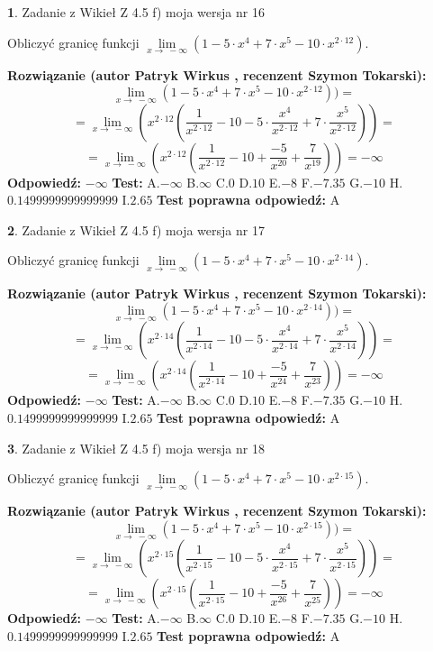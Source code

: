 \documentclass[12pt, a4paper]{article}
\theoremstyle{definition} %
\newtheorem{zad}{}
\newcommand{\zadStart}[1]{\begin{zad}#1\newline}
\newcommand{\zadStop}{\end{zad}}
\newcommand{\rozwStart}[2]{\noindent \textbf{Rozwiązanie (autor #1 , recenzent #2): }\newline}
\newcommand{\rozwStop}{\newline}
\newcommand{\odpStart}{\noindent \textbf{Odpowiedź:}\newline}
\newcommand{\odpStop}{\newline}
\newcommand{\testStart}{\noindent \textbf{Test:}\newline}
\newcommand{\testStop}{\newline}
\newcommand{\kluczStart}{\noindent \textbf{Test poprawna odpowiedź:}\newline}
\newcommand{\kluczStop}{\newline}
\begin{document}
\zadStart{Zadanie z Wikieł Z 4.5 f) moja wersja nr 16}


Obliczyć granicę funkcji  $\lim\limits_{x\to\ -\infty}(1 - 5 \cdot x^{4}+7 \cdot x^{5}- 10 \cdot x^{2\cdot12})$.
\zadStop
\rozwStart{Patryk Wirkus}{Szymon Tokarski}
$$\lim\limits_{x\to\ -\infty}(1 - 5 \cdot x^{4}+7 \cdot x^{5}- 10 \cdot x^{2\cdot12}))=$$
$$=\lim\limits_{x\to\ -\infty}(x^{2\cdot12}(\frac{1}{x^{2\cdot12}}-10 -5 \cdot \frac{x^{4}}{x^{2\cdot12}}+7 \cdot \frac{x^{5}}{x^{2\cdot12}}))=$$
$$=\lim\limits_{x\to\ -\infty}(x^{2\cdot12}(\frac{1}{x^{2\cdot12}}-10 + \frac{-5}{x^{20}}+ \frac{7}{x^{19}}))=-\infty$$
\rozwStop
\odpStart
$-\infty$
\odpStop
\testStart
A.$-\infty$ B.$\infty$ C.$0$ D.$10$ E.$-8$
F.$-7.35$ G.$-10$
H.$0.1499999999999999$
I.$2.65$
\testStop
\kluczStart
A
\kluczStop



\zadStart{Zadanie z Wikieł Z 4.5 f) moja wersja nr 17}


Obliczyć granicę funkcji  $\lim\limits_{x\to\ -\infty}(1 - 5 \cdot x^{4}+7 \cdot x^{5}- 10 \cdot x^{2\cdot14})$.
\zadStop
\rozwStart{Patryk Wirkus}{Szymon Tokarski}
$$\lim\limits_{x\to\ -\infty}(1 - 5 \cdot x^{4}+7 \cdot x^{5}- 10 \cdot x^{2\cdot14}))=$$
$$=\lim\limits_{x\to\ -\infty}(x^{2\cdot14}(\frac{1}{x^{2\cdot14}}-10 -5 \cdot \frac{x^{4}}{x^{2\cdot14}}+7 \cdot \frac{x^{5}}{x^{2\cdot14}}))=$$
$$=\lim\limits_{x\to\ -\infty}(x^{2\cdot14}(\frac{1}{x^{2\cdot14}}-10 + \frac{-5}{x^{24}}+ \frac{7}{x^{23}}))=-\infty$$
\rozwStop
\odpStart
$-\infty$
\odpStop
\testStart
A.$-\infty$ B.$\infty$ C.$0$ D.$10$ E.$-8$
F.$-7.35$ G.$-10$
H.$0.1499999999999999$
I.$2.65$
\testStop
\kluczStart
A
\kluczStop



\zadStart{Zadanie z Wikieł Z 4.5 f) moja wersja nr 18}


Obliczyć granicę funkcji  $\lim\limits_{x\to\ -\infty}(1 - 5 \cdot x^{4}+7 \cdot x^{5}- 10 \cdot x^{2\cdot15})$.
\zadStop
\rozwStart{Patryk Wirkus}{Szymon Tokarski}
$$\lim\limits_{x\to\ -\infty}(1 - 5 \cdot x^{4}+7 \cdot x^{5}- 10 \cdot x^{2\cdot15}))=$$
$$=\lim\limits_{x\to\ -\infty}(x^{2\cdot15}(\frac{1}{x^{2\cdot15}}-10 -5 \cdot \frac{x^{4}}{x^{2\cdot15}}+7 \cdot \frac{x^{5}}{x^{2\cdot15}}))=$$
$$=\lim\limits_{x\to\ -\infty}(x^{2\cdot15}(\frac{1}{x^{2\cdot15}}-10 + \frac{-5}{x^{26}}+ \frac{7}{x^{25}}))=-\infty$$
\rozwStop
\odpStart
$-\infty$
\odpStop
\testStart
A.$-\infty$ B.$\infty$ C.$0$ D.$10$ E.$-8$
F.$-7.35$ G.$-10$
H.$0.1499999999999999$
I.$2.65$
\testStop
\kluczStart
A
\kluczStop
\end{document}
